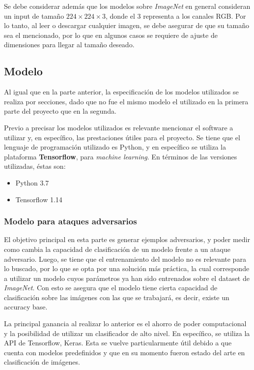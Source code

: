 \documentclass[conference]{IEEEtran}
\begin{document}
Se debe considerar además que los modelos sobre \textit{ImageNet} en general consideran un input de tamaño $224 \times 224 \times 3$, donde el 3 representa a los canales RGB. Por lo tanto, al leer o descargar cualquier imagen, se debe asegurar de que su tamaño sea el mencionado, por lo que en algunos casos se requiere de ajuste de dimensiones para llegar al tamaño deseado.

\subsection{Modelo}

Al igual que en la parte anterior, la especificación de los modelos utilizados se realiza por secciones, dado que no fue el mismo modelo el utilizado en la primera parte del proyecto que en la segunda. 

Previo a precisar los modelos utilizados es relevante mencionar el software a utilizar y, en específico, las prestaciones útiles para el proyecto. Se tiene que el lenguaje de programación utilizado es Python, y en específico se utiliza la plataforma \textbf{Tensorflow}, para \textit{machine learning}. En términos de las versiones utilizadas, éstas son:
\begin{itemize}
    \item Python 3.7
    \item Tensorflow 1.14
\end{itemize}

\subsubsection{Modelo para ataques adversarios}

El objetivo principal en esta parte es generar ejemplos adversarios, y poder medir como cambia la capacidad de clasificación de un modelo frente a un ataque adversario. Luego, se tiene que el entrenamiento del modelo no es relevante para lo buscado, por lo que se opta por una solución más práctica, la cual corresponde a utilizar un modelo cuyos parámetros ya han sido entrenados sobre el dataset de \textit{ImageNet}. Con esto se asegura que el modelo tiene cierta capacidad de clasificación sobre las imágenes con las que se trabajará, es decir, existe un accuracy base.

La principal ganancia al realizar lo anterior es el ahorro de poder computacional y la posibilidad de utilizar un clasificador de alto nivel. En específico, se utiliza la API de Tensorflow, Keras. Esta se vuelve particularmente útil debido a que cuenta con modelos predefinidos y que en su momento fueron estado del arte en clasificación de imágenes.
\end{document}
